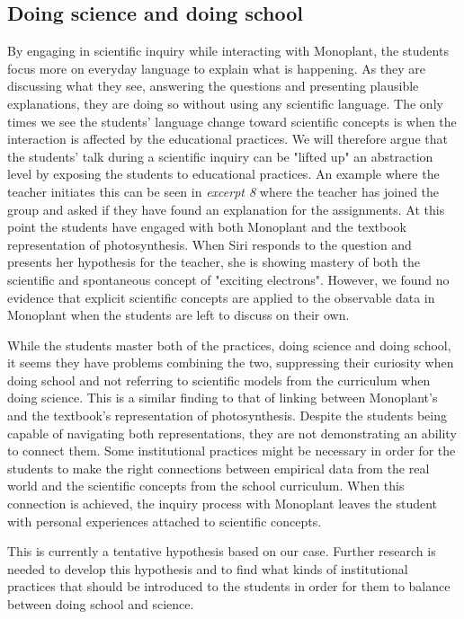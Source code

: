 \subsection{Doing science and doing school}
By engaging in scientific inquiry while interacting with Monoplant, the students focus more on everyday language to explain what is happening. As they are discussing what they see, answering the questions and presenting plausible explanations, they are doing so without using any scientific language. The only times we see the students' language change toward scientific concepts is when the interaction is affected by the educational practices. We will therefore argue that the students' talk during a scientific inquiry can be "lifted up" an abstraction level by exposing the students to educational practices. An example where the teacher initiates this can be seen in \emph{excerpt 8} where the teacher has joined the group and asked if they have found an explanation for the assignments. At this point the students have engaged with both Monoplant and the textbook representation of photosynthesis. When Siri responds to the question and presents her hypothesis for the teacher, she is showing mastery of both the scientific and spontaneous concept of "exciting electrons". However, we found no evidence that explicit scientific concepts are applied to the observable data in Monoplant when the students are left to discuss on their own. 

While the students master both of the practices, doing science and doing school, it seems they have problems combining the two, suppressing their curiosity when doing school and not referring to scientific models from the curriculum when doing science. This is a similar finding to that of linking between Monoplant's and the textbook's representation of photosynthesis. Despite the students being capable of navigating both representations, they are not demonstrating an ability to connect them. Some institutional practices might be necessary in order for the students to make the right connections between empirical data from the real world and the scientific concepts from the school curriculum. When this connection is achieved, the inquiry process with Monoplant leaves the student with personal experiences attached to scientific concepts. 

This is currently a tentative hypothesis based on our case. Further research is needed to develop this hypothesis and to find what kinds of institutional practices that should be introduced to the students in order for them to balance between doing school and science.



